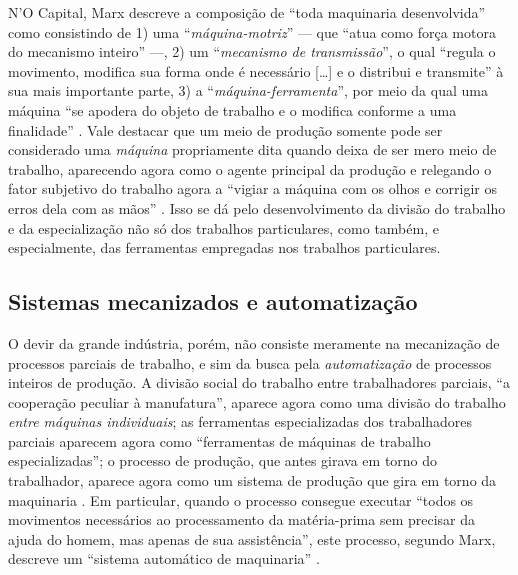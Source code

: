 N'O Capital, Marx descreve a composição de ``toda maquinaria desenvolvida'' como consistindo de 1) uma ``\emph{máquina-motriz}'' --- que ``atua como força motora do mecanismo inteiro'' ---, 2) um ``\emph{mecanismo de transmissão}'', o qual ``regula o movimento, modifica sua forma onde é necessário [\ldots] e o distribui e transmite'' à sua mais importante parte, 3) a ``\emph{máquina-ferramenta}'', por meio da qual uma máquina ``se apodera do objeto de trabalho e o modifica conforme a uma finalidade'' \parencite[p. 446-7, grifo meu]{Marx2017}. Vale destacar que um meio de produção somente pode ser considerado uma \emph{máquina} propriamente dita quando deixa de ser mero meio de trabalho, aparecendo agora como o agente principal da produção e relegando o fator subjetivo do trabalho agora a ``vigiar a máquina com os olhos e corrigir os erros dela com as mãos'' \parencite[p. 448]{Marx2017}. Isso se dá pelo desenvolvimento da divisão do trabalho e da especialização não só dos trabalhos particulares, como também, e especialmente, das ferramentas empregadas nos trabalhos particulares.

\subsection{Sistemas mecanizados e automatização}
O devir da grande indústria, porém, não consiste meramente na mecanização de processos parciais de trabalho, e sim da busca pela \textit{automatização} de processos inteiros de produção. A divisão social do trabalho entre trabalhadores parciais, ``a cooperação peculiar à manufatura'', aparece agora como uma divisão do trabalho \textit{entre máquinas individuais}; as ferramentas especializadas dos trabalhadores parciais aparecem agora como ``ferramentas de máquinas de trabalho especializadas''; o processo de produção, que antes girava em torno do trabalhador, aparece agora como um sistema de produção que gira em torno da maquinaria \parencite[p. 453]{Marx2017}. Em particular, quando o processo consegue executar ``todos os movimentos necessários ao processamento da matéria-prima sem precisar da ajuda do homem, mas apenas de sua assistência'', este processo, segundo Marx, descreve um ``sistema automático de maquinaria'' \parencite[p. 455]{Marx2017}.

